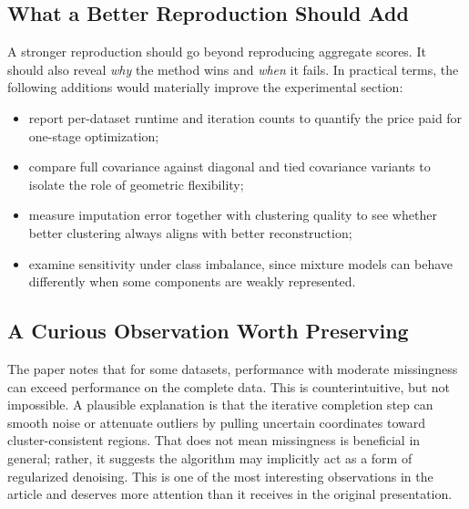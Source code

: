 \subsection{What a Better Reproduction Should Add}
A stronger reproduction should go beyond reproducing aggregate scores. It should also reveal \emph{why} the method wins and \emph{when} it fails. In practical terms, the following additions would materially improve the experimental section:
\begin{itemize}
    \item report per-dataset runtime and iteration counts to quantify the price paid for one-stage optimization;
    \item compare full covariance against diagonal and tied covariance variants to isolate the role of geometric flexibility;
    \item measure imputation error together with clustering quality to see whether better clustering always aligns with better reconstruction;
    \item examine sensitivity under class imbalance, since mixture models can behave differently when some components are weakly represented.
\end{itemize}

\subsection{A Curious Observation Worth Preserving}
The paper notes that for some datasets, performance with moderate missingness can exceed performance on the complete data. This is counterintuitive, but not impossible. A plausible explanation is that the iterative completion step can smooth noise or attenuate outliers by pulling uncertain coordinates toward cluster-consistent regions. That does not mean missingness is beneficial in general; rather, it suggests the algorithm may implicitly act as a form of regularized denoising. This is one of the most interesting observations in the article and deserves more attention than it receives in the original presentation.

